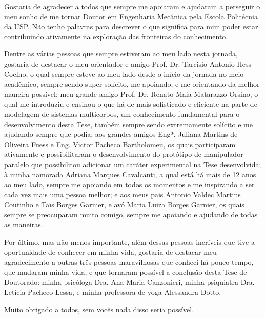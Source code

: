 \documentclass[]{politex}
\begin{document}
\begin{agradecimentos}

Gostaria de agradecer a todos que sempre me apoiaram e ajudaram a perseguir o meu sonho de me tornar Doutor em Engenharia Mecânica pela Escola Politécnia da USP. Não tenho palavras para descrever o que significa para mim poder estar contribuindo ativamente na exploração das fronteiras do conhecimento.

Dentre as várias pessoas que sempre estiveram ao meu lado nesta jornada, gostaria de destacar o meu orientador e amigo Prof. Dr. Tarcisio Antonio Hess Coelho, o qual sempre esteve ao meu lado desde o início da jornada no meio acadêmico, sempre sendo super solícito, me apoiando, e me orientando da melhor maneira possível; meu grande amigo Prof. Dr. Renato Maia Matarazzo Orsino, o qual me introduziu e ensinou o que há de mais sofisticado e eficiente na parte de modelagem de sistemas multicorpos, um conhecimento fundamental para o desenvolvimento desta Tese, também sempre sendo extremamente solícito e me ajudando sempre que podia; aos grandes amigos Engª. Juliana Martins de Oliveira Fuess e Eng. Victor Pacheco Bartholomeu, os quais participaram ativamente e possibilitaram o desenvolvimento do protótipo de manipulador paralelo que possibilitou adicionar um caráter experimental na Tese desenvolvida; à minha namorada Adriana Marques Cavalcanti, a qual está há mais de 12 anos ao meu lado, sempre me apoiando em todos os momentos e me inspirando a ser cada vez mais uma pessoa melhor; e aos meus pais Antonio Valdec Martins Coutinho e Taïs Borges Garnier, e avó Maria Luiza Borges Garnier, os quais sempre se preocuparam muito comigo, sempre me apoiando e ajudando de todas as maneiras.

Por último, mas não menos importante, além dessas pessoas incríveis que tive a oportunidade de conhecer em minha vida, gostaria de destacar meu agradecimento a outras três pessoas maravilhosas que conheci há pouco tempo, que mudaram minha vida, e que tornaram possível a conclusão desta Tese de Doutorado: minha psicóloga Dra. Ana Maria Canzonieri, minha psiquiatra Dra. Letícia Pacheco Lessa, e minha professora de yoga Alessandra Dotto.

Muito obrigado a todos, sem vocês nada disso seria possível.

\end{agradecimentos}
\end{document}
